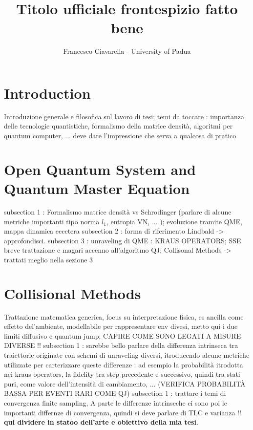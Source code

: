 \documentclass[a4paper,12pt]{article}
\title{
	\vspace{2cm}
	\Huge \textbf{Titolo ufficiale} \newline
	\large frontespizio fatto bene
}
\author{\Large Francesco Ciavarella - University of Padua \\[10pt]}
\begin{document}
	
	\maketitle
	\thispagestyle{empty}
	\newpage
	
	\tableofcontents
	\newpage
	
	\section{Introduction}
	\label{sec:intro}
	Introduzione generale e filosofica sul lavoro di tesi; temi da toccare : importanza delle tecnologie quantistiche, formalismo della matrice densità, algoritmi per quantum computer, ...
	deve dare l'impressione che serva a qualcosa di pratico
	
	\clearpage
	\newpage
	
	\section{Open Quantum System and Quantum Master Equation}
	\label{sec:Open_Quantum_System_and_Quantum_Master_Equation}
	
	subsection 1 : Formalismo matrice densità vs Schrodinger (parlare di alcune metriche importanti tipo norma $l_1$, entropia VN, ... ); evoluzione tramite QME, mappa dinamica eccetera 
	subsection 2 : forma di riferimento Lindbald -> approfondisci.
	subsection 3 : unraveling di QME : KRAUS OPERATORS; SSE breve trattazione e magari accenno all'algoritmo QJ; Collisonal Methods -> trattati meglio nella sezione 3 
	
	\section{Collisional Methods} 
	\label{sec:Collisional_Methods}
	Trattazione matematica generica, focus su interpretazione fisica, es ancilla come effetto del'ambiente, modellabile per rappresentare env divesi, metto qui i due limiti diffusivo e quantum jump; 	CAPIRE COME SONO LEGATI A MISURE DIVERSE !! 
	subsection 1 :
	sarebbe bello parlare della differenza intrinseca tra traiettorie originate con schemi di unraveling diversi, itroducendo alcune metriche utilizzate per carterizzare queste differenze : ad esempio la probabilità itrodotta nei kraus operators, la fidelity tra step precedente e successivo, quindi tra stati puri, come valore dell'intensità di cambiamento, ... 
	(VERIFICA PROBABILITÀ BASSA PER EVENTI RARI COME QJ)
	subsection 1 :
	trattare i temi di convergenza finite sampling,
	A parte le differenze intrinseche ci sono poi le importanti differnze di convergenza, quindi si deve parlare di TLC e varianza !!
	\textbf{qui dividere in statoo dell'arte e obiettivo della mia tesi}.
\end{document}

